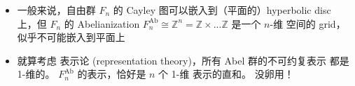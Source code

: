 \documentclass[15pt]{beamer}
\newcommand{\cc}[2]{#1}
\newcommand{\cc}[2]{#2}
\newcommand{\red}[1]{{\color{red}#1}}
\begin{document}
\begin{frame}
\begin{itemize}
\begin{equation}
		\end{equation}
		
	\item \cc{
	一般来说，自由群 $F_n$ 的 Cayley 图可以嵌入到（平面的）hyperbolic disc 上，但 $F_n$ 的 Abelianization $F_n^{\text{Ab}} \cong \mathbb{Z}^n = \mathbb{Z} \times ... \mathbb{Z}$ 是一个 \red{$n$-维} 空间的 grid，似乎不可能嵌入到平面上}{
	Generally, the free group $F_n$'s Cayley graph can be embedded into the (planar) hyperbolic disc, but the Abelianization of $F_n = F_n^{\text{Ab}} \cong \mathbb{Z}^n = \mathbb{Z} \times ... \mathbb{Z}$ is a \red{$n$-dimensional} grid, which seems impossible to embed on a plane.
	}
	\item \cc{
	就算考虑 表示论 (representation theory)，所有 Abel 群的不可约复表示 都是 1-维的。 $F_n^{\text{Ab}}$ 的表示，恰好是 $n$ 个 1-维 表示的直和。 没卵用！}{
	Even considering representation theory, all irreducible representations of Abelian groups are 1-dimensional.  The representation of $F_n^{\text{Ab}}$ is precisely the direct sum of $n$ copies of dim-1 representations.  Useless!
	}
	
\end{itemize}
\end{frame}
\end{document}
